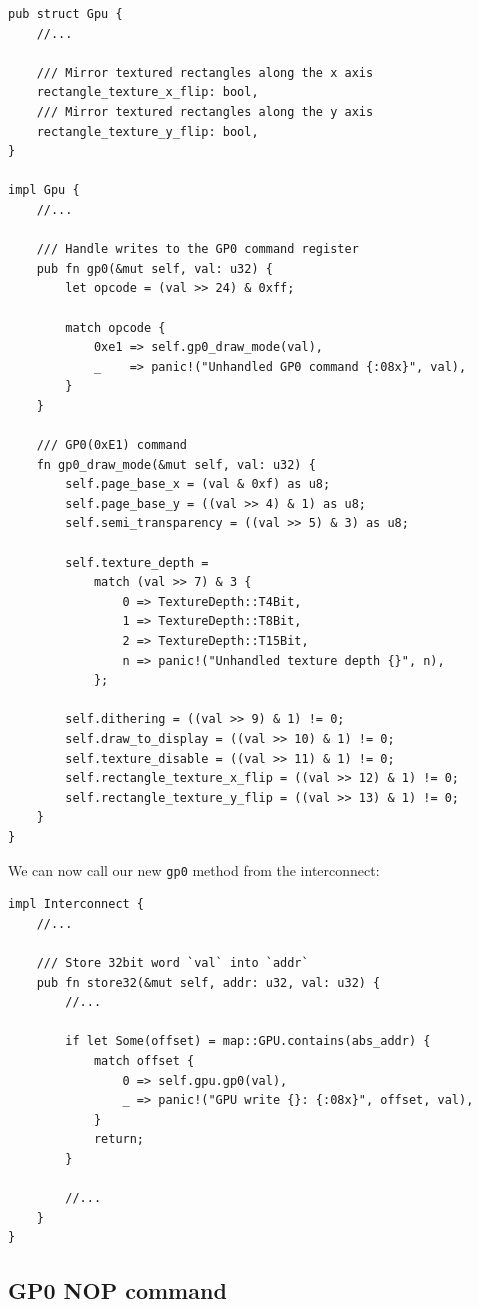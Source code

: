 \documentclass[a4paper]{article}
\newcommand{\code}[1] {\texttt{#1}}
\begin{document}
\begin{lstlisting}
pub struct Gpu {
    //...

    /// Mirror textured rectangles along the x axis
    rectangle_texture_x_flip: bool,
    /// Mirror textured rectangles along the y axis
    rectangle_texture_y_flip: bool,
}

impl Gpu {
    //...

    /// Handle writes to the GP0 command register
    pub fn gp0(&mut self, val: u32) {
        let opcode = (val >> 24) & 0xff;

        match opcode {
            0xe1 => self.gp0_draw_mode(val),
            _    => panic!("Unhandled GP0 command {:08x}", val),
        }
    }

    /// GP0(0xE1) command
    fn gp0_draw_mode(&mut self, val: u32) {
        self.page_base_x = (val & 0xf) as u8;
        self.page_base_y = ((val >> 4) & 1) as u8;
        self.semi_transparency = ((val >> 5) & 3) as u8;

        self.texture_depth =
            match (val >> 7) & 3 {
                0 => TextureDepth::T4Bit,
                1 => TextureDepth::T8Bit,
                2 => TextureDepth::T15Bit,
                n => panic!("Unhandled texture depth {}", n),
            };

        self.dithering = ((val >> 9) & 1) != 0;
        self.draw_to_display = ((val >> 10) & 1) != 0;
        self.texture_disable = ((val >> 11) & 1) != 0;
        self.rectangle_texture_x_flip = ((val >> 12) & 1) != 0;
        self.rectangle_texture_y_flip = ((val >> 13) & 1) != 0;
    }
}
\end{lstlisting}

We can now call our new \code{gp0} method from the interconnect:

\begin{lstlisting}
impl Interconnect {
    //...

    /// Store 32bit word `val` into `addr`
    pub fn store32(&mut self, addr: u32, val: u32) {
        //...

        if let Some(offset) = map::GPU.contains(abs_addr) {
            match offset {
                0 => self.gpu.gp0(val),
                _ => panic!("GPU write {}: {:08x}", offset, val),
            }
            return;
        }

        //...
    }
}
\end{lstlisting}

\subsection{GP0 NOP command}
\end{document}
